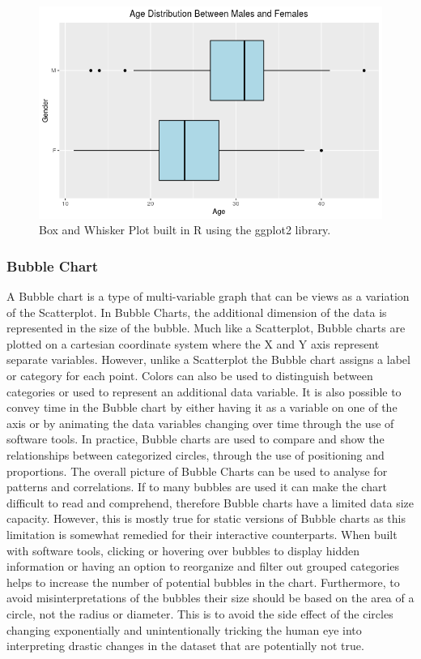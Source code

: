 \begin{figure}[H]
    \centering
        \includegraphics[scale=0.4]{figures/box_and_whisker.png}
    \caption{Box and Whisker Plot built in R using the ggplot2 library.}
    \label{figure:box_and_whisker}
\end{figure} 

\subsubsection{Bubble Chart}
A Bubble chart is a type of multi-variable graph that can be views as a variation 
of the Scatterplot. In Bubble Charts, the additional dimension of the data is represented 
in the size of the bubble. Much like a Scatterplot, Bubble charts are plotted on 
a cartesian coordinate system where the X and Y axis represent separate variables. 
However, unlike a Scatterplot the Bubble chart assigns a label or category for
each point. Colors can also be used to distinguish between categories or used to 
represent an additional data variable. It is also possible to convey time in the
Bubble chart by either having it as a variable on one of the axis or by animating 
the data variables changing over time through the use of software tools. In practice,
Bubble charts are used to compare and show the relationships between categorized 
circles, through the use of positioning and proportions. The overall picture of 
Bubble Charts can be used to analyse for patterns and correlations. If to many bubbles 
are used it can make the chart difficult to read and comprehend, therefore Bubble 
charts have a limited data size capacity. However, this is mostly true for static 
versions of Bubble charts as this limitation is somewhat remedied for their interactive 
counterparts. When built with software tools, clicking or hovering over bubbles 
to display hidden information or having an option to reorganize and filter out 
grouped categories helps to increase the number of potential bubbles in the chart. 
Furthermore, to avoid misinterpretations of the bubbles their size should be based 
on the area of a circle, not the radius or diameter. This is to avoid the side 
effect of the circles changing exponentially and unintentionally tricking the 
human eye into interpreting drastic changes in the dataset that are potentially 
not true.

